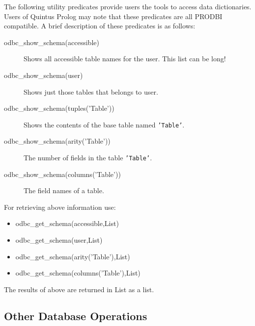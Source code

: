 The following utility predicates provide users the tools to access data 
dictionaries.  Users of Quintus Prolog may note that these predicates are all 
PRODBI compatible.  A brief description of these predicates is as follows:
\begin{description}

\item[odbc\_show\_schema(accessible)]
         Shows all accessible table names for the user.  This list can be long!

\item[odbc\_show\_schema(user)]
        Shows just those tables that belongs to user.

\item[odbc\_show\_schema(tuples('Table'))]
        Shows the contents of the base table named {\tt 'Table'}.

\item[odbc\_show\_schema(arity('Table'))]
        The number of fields in the table {\tt 'Table'}.

\item[odbc\_show\_schema(columns('Table'))]
        The field names of a table.
\end{description}

For retrieving above information use:
\begin{itemize}

\item odbc\_get\_schema(accessible,List)
\item odbc\_get\_schema(user,List)
\item odbc\_get\_schema(arity('Table'),List)
\item odbc\_get\_schema(columns('Table'),List)
\end{itemize}

The results of above are returned in List as a list.

\subsection{Other Database Operations}

